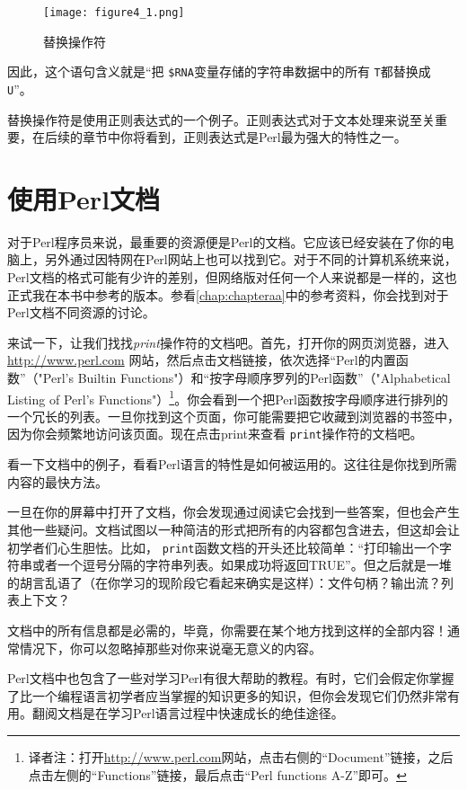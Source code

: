 \begin{figure}
  \centering
  \texttt{[image: figure4\_1.png]}
  \caption{替换操作符}
  \label{fig:figure4.1}
\end{figure}

因此，这个语句含义就是“把 \verb|$RNA|变量存储的字符串数据中的所有 \verb|T|都替换成 \verb|U|”。

替换操作符是使用正则表达式的一个例子。正则表达式对于文本处理来说至关重要，在后续的章节中你将看到，正则表达式是Perl最为强大的特性之一。

\section{使用Perl文档}
对于Perl程序员来说，最重要的资源便是Perl的文档。它应该已经安装在了你的电脑上，另外通过因特网在Perl网站上也可以找到它。对于不同的计算机系统来说，Perl文档的格式可能有少许的差别，但网络版对任何一个人来说都是一样的，这也正式我在本书中参考的版本。参看\autoref{chap:chapteraa}中的参考资料，你会找到对于Perl文档不同资源的讨论。

来试一下，让我们找找\textit{print}操作符的文档吧。首先，打开你的网页浏览器，进入 \href{http://www.perl.com}{http://www.perl.com} 网站，然后点击文档链接，依次选择“Perl的内置函数”（"Perl's Builtin Functions"）和“按字母顺序罗列的Perl函数”（"Alphabetical Listing of Perl's Functions"）\footnote{译者注：打开\href{http://www.perl.com}{http://www.perl.com}网站，点击右侧的“Document”链接，之后点击左侧的“Functions”链接，最后点击“Perl functions A-Z”即可。}。你会看到一个把Perl函数按字母顺序进行排列的一个冗长的列表。一旦你找到这个页面，你可能需要把它收藏到浏览器的书签中，因为你会频繁地访问该页面。现在点击print来查看 \verb|print|操作符的文档吧。

看一下文档中的例子，看看Perl语言的特性是如何被运用的。这往往是你找到所需内容的最快方法。

一旦在你的屏幕中打开了文档，你会发现通过阅读它会找到一些答案，但也会产生其他一些疑问。文档试图以一种简洁的形式把所有的内容都包含进去，但这却会让初学者们心生胆怯。比如， \verb|print|函数文档的开头还比较简单：“打印输出一个字符串或者一个逗号分隔的字符串列表。如果成功将返回TRUE”。但之后就是一堆的胡言乱语了（在你学习的现阶段它看起来确实是这样）：文件句柄？输出流？列表上下文？

文档中的所有信息都是必需的，毕竟，你需要在某个地方找到这样的全部内容！通常情况下，你可以忽略掉那些对你来说毫无意义的内容。

Perl文档中也包含了一些对学习Perl有很大帮助的教程。有时，它们会假定你掌握了比一个编程语言初学者应当掌握的知识更多的知识，但你会发现它们仍然非常有用。翻阅文档是在学习Perl语言过程中快速成长的绝佳途径。

